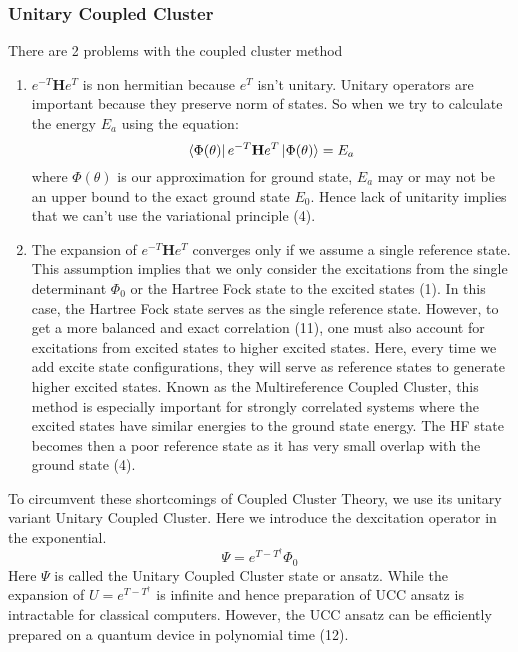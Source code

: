 \documentclass{article}
\begin{document}
    \subsubsection{Unitary Coupled Cluster}
      There are 2 problems with the coupled cluster method
      \begin{enumerate}
        \item \(e^{-T}\mathbf{H}e^{T}\) is non hermitian because
        \(e^T\) isn't unitary. Unitary operators are important
        because they preserve norm of states. So when we try to calculate
        the energy \(E_a\) using the equation:
        \[\bra{\Phi(\theta)}e^{-T}\mathbf{H}e^{T}\ket{\Phi(\theta)} = E_a\]
        where \(\Phi(\theta)\) is our approximation for ground state, \(E_a\)
        may or may not be an upper bound to the exact ground state \(E_0\).
        Hence lack of unitarity implies that we can't use the variational
        principle (4).

        \item The expansion of \(e^{-T}\mathbf{H}e^{T}\) converges only if we
        assume a single reference state. This assumption implies that we only
        consider the excitations from the single determinant \(\Phi_0\) or
         the Hartree Fock state to the excited states (1). In this case, the
         Hartree Fock state serves as the single reference state.
        However, to get a more balanced and exact correlation (11), one must also
        account for excitations from excited states to higher excited states.
        Here, every time we add excite state configurations, they will serve
        as reference states to generate higher excited states. Known as the
        Multireference Coupled Cluster, this method is especially important
        for strongly correlated systems where the excited states have
        similar energies to the ground state energy. The HF state becomes then
        a poor reference state as it has very small overlap with the ground
        state (4).
      \end{enumerate}
      To circumvent these shortcomings of Coupled Cluster Theory, we use its
      unitary variant Unitary Coupled Cluster. Here we introduce the
      dexcitation operator in the exponential.
      \[\Psi = e^{T - T^{\dagger}}\Phi_0\]
      Here \(\Psi\) is called the Unitary Coupled Cluster state or ansatz.
      While the expansion of \(U =e^{T - T^{\dagger}}\) is infinite and
      hence preparation of UCC ansatz is intractable for
      classical computers. However, the UCC ansatz can be efficiently
      prepared on a quantum device in polynomial time (12).
\end{document}
